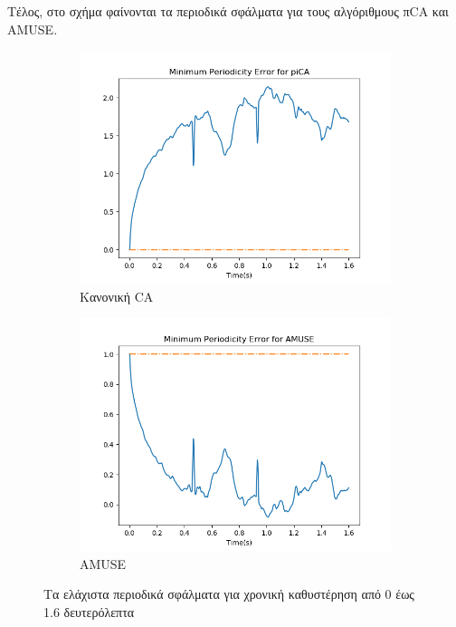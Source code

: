 \noindent Τέλος, στο σχήμα φαίνονται τα περιοδικά σφάλματα για τους αλγόριθμους π\en CA \gr και \en AMUSE. \gr
\begin{figure}[H]
    \centering
    \begin{subfigure}[b]{0.48 \textwidth}
        \centering
       \includegraphics[width=\textwidth]{r01database/pica_error.png}\en
        \caption{\gr Κανονική \en \pi CA} \gr
    \end{subfigure}
    \hfill
    \begin{subfigure}[b]{0.48 \textwidth}
        \centering
        \includegraphics[width=\textwidth]{r01database/amuse_error.png}\en
        \caption{AMUSE} \gr
    \end{subfigure}
    \gr
    \caption{Τα ελάχιστα περιοδικά σφάλματα για χρονική καθυστέρηση από 0 έως 1.6 δευτερόλεπτα}
    \label{fig:5.26}
\end{figure}
